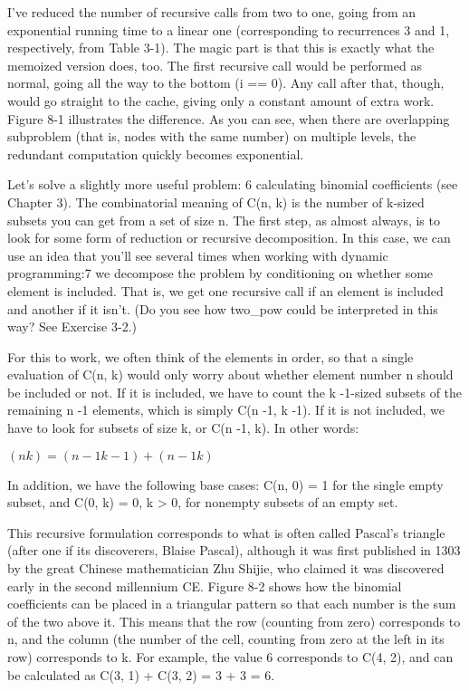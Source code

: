 I've reduced the number of recursive calls from two to one, going from an exponential running time
to a linear one (corresponding to recurrences 3 and 1, respectively, from Table 3-1). The magic part is that this is exactly what the memoized version does, too. The first recursive call would be performed as normal, going all the way to the bottom (i == 0). Any call after that, though, would go straight to the cache, giving only a constant amount of extra work. Figure 8-1 illustrates the difference. As you can see, when there are overlapping subproblem (that is, nodes with the same number) on multiple levels, the redundant computation quickly becomes exponential.


Let's solve a slightly more useful problem: 6 calculating binomial coefficients (see Chapter 3). The combinatorial meaning of C(n, k) is the number of k-sized subsets you can get from a set of size n. The first step, as almost always, is to look for some form of reduction or recursive decomposition. In this case, we can use an idea that you'll see several times when working with dynamic programming:7 we decompose the problem by conditioning on whether some element is included. That is, we get one recursive call if an element is included and another if it isn't. (Do you see how two\_pow could be interpreted in this way? See Exercise 3-2.)

For this to work, we often think of the elements in order, so that a single evaluation of C(n, k) would only worry about whether element number n should be included or not. If it is included, we have to count the k -1-sized subsets of the remaining n -1 elements, which is simply C(n -1, k -1). If it is not included, we have to look for subsets of size k, or C(n -1, k). In other words:

$(n k) = (n-1 k-1) + (n-1 k)$

In addition, we have the following base cases: C(n, 0) = 1 for the single empty subset, and
C(0, k) = 0, k > 0, for nonempty subsets of an empty set.

This recursive formulation corresponds to what is often called Pascal's triangle (after one if its
discoverers, Blaise Pascal), although it was first published in 1303 by the great Chinese mathematician Zhu Shijie, who claimed it was discovered early in the second millennium CE. Figure 8-2 shows how the binomial coefficients can be placed in a triangular pattern so that each number is the sum of the two above it. This means that the row (counting from zero) corresponds to n, and the column (the number of the cell, counting from zero at the left in its row) corresponds to k. For example, the value 6 corresponds to C(4, 2), and can be calculated as C(3, 1) + C(3, 2) = 3 + 3 = 6.

